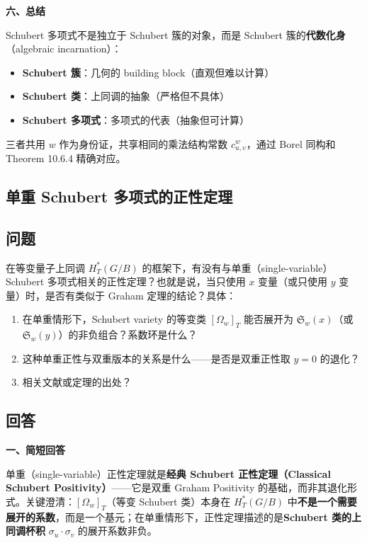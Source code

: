 \textbf{六、总结}

Schubert 多项式不是独立于 Schubert 簇的对象，而是 Schubert 簇的\textbf{代数化身}（algebraic incarnation）：

\begin{itemize}
\item \textbf{Schubert 簇}：几何的 building block（直观但难以计算）
\item \textbf{Schubert 类}：上同调的抽象（严格但不具体）
\item \textbf{Schubert 多项式}：多项式的代表（抽象但可计算）
\end{itemize}

三者共用 $w$ 作为身份证，共享相同的乘法结构常数 $c_{u,v}^w$，通过 Borel 同构和 Theorem 10.6.4 精确对应。

\subsection{单重 Schubert 多项式的正性定理}\label{sec:qa-SingleVariablePositivity}
\subsection{问题}
在等变量子上同调 $H_T^*(G/B)$ 的框架下，有没有与单重（single-variable）Schubert 多项式相关的正性定理？也就是说，当只使用 $x$ 变量（或只使用 $y$ 变量）时，是否有类似于 Graham 定理的结论？具体：
\begin{enumerate}
\item 在单重情形下，Schubert variety 的等变类 $[\Omega_w]_T$ 能否展开为 $\mathfrak{S}_w(x)$（或 $\mathfrak{S}_w(y)$）的非负组合？系数环是什么？
\item 这种单重正性与双重版本的关系是什么——是否是双重正性取 $y = 0$ 的退化？
\item 相关文献或定理的出处？
\end{enumerate}

\subsection{回答}

\textbf{一、简短回答}

单重（single-variable）正性定理就是\textbf{经典 Schubert 正性定理（Classical Schubert Positivity）}——它是双重 Graham Positivity 的基础，而非其退化形式。关键澄清：$[\Omega_w]_T$（等变 Schubert 类）本身在 $H_T^*(G/B)$ 中\textbf{不是一个需要展开的系数}，而是一个基元；在单重情形下，正性定理描述的是\textbf{Schubert 类的上同调杯积} $\sigma_u \cdot \sigma_v$ 的展开系数非负。

